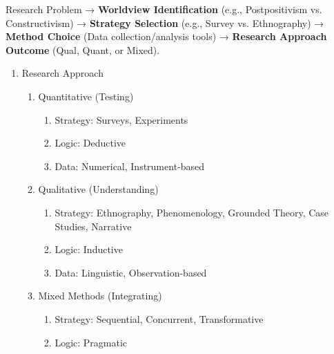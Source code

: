 \documentclass{report}
\begin{document}
\begin{flownotes}
    Research Problem → \textbf{Worldview Identification} (e.g., Postpositivism vs. Constructivism) → \textbf{Strategy Selection} (e.g., Survey vs. Ethnography) → \textbf{Method Choice} (Data collection/analysis tools) → \textbf{Research Approach Outcome} (Qual, Quant, or Mixed).
\end{flownotes}

\begin{mindmaps}
    \begin{enumerate}
        \item Research Approach
        \begin{enumerate}
            \item Quantitative (Testing)
            \begin{enumerate}
                \item Strategy: Surveys, Experiments
                \item Logic: Deductive
                \item Data: Numerical, Instrument-based
            \end{enumerate}
            \item Qualitative (Understanding)
            \begin{enumerate}
                \item Strategy: Ethnography, Phenomenology, Grounded Theory, Case Studies, Narrative
                \item Logic: Inductive
                \item Data: Linguistic, Observation-based
            \end{enumerate}
            \item Mixed Methods (Integrating)
            \begin{enumerate}
                \item Strategy: Sequential, Concurrent, Transformative
                \item Logic: Pragmatic
            \end{enumerate}
        \end{enumerate}
    \end{enumerate}
\end{mindmaps}
\end{document}
